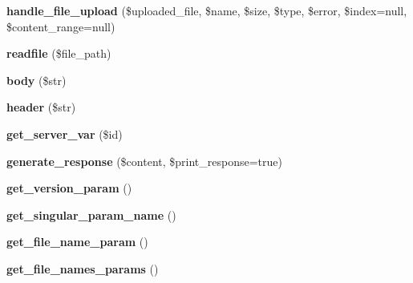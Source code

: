 \begin{DoxyCompactItemize}
\item 
\hypertarget{class_upload_handler_ad03bbc690543eac3e157c3b015d088a4}{{\bfseries handle\-\_\-file\-\_\-upload} (\$uploaded\-\_\-file, \$name, \$size, \$type, \$error, \$index=null, \$content\-\_\-range=null)}\label{class_upload_handler_ad03bbc690543eac3e157c3b015d088a4}

\item 
\hypertarget{class_upload_handler_aea88401817b9fb816c494323b285604a}{{\bfseries readfile} (\$file\-\_\-path)}\label{class_upload_handler_aea88401817b9fb816c494323b285604a}

\item 
\hypertarget{class_upload_handler_ae0c595db98ffd64843b71686f25179c5}{{\bfseries body} (\$str)}\label{class_upload_handler_ae0c595db98ffd64843b71686f25179c5}

\item 
\hypertarget{class_upload_handler_a3af02a257dae588ef2d306d5b936d7cc}{{\bfseries header} (\$str)}\label{class_upload_handler_a3af02a257dae588ef2d306d5b936d7cc}

\item 
\hypertarget{class_upload_handler_ae346ec8ea9b4ccbd606b161abe8fd49e}{{\bfseries get\-\_\-server\-\_\-var} (\$id)}\label{class_upload_handler_ae346ec8ea9b4ccbd606b161abe8fd49e}

\item 
\hypertarget{class_upload_handler_a137517f0cfb55dd68c4f868b4caf82f5}{{\bfseries generate\-\_\-response} (\$content, \$print\-\_\-response=true)}\label{class_upload_handler_a137517f0cfb55dd68c4f868b4caf82f5}

\item 
\hypertarget{class_upload_handler_a787019fce1133b3f28221c29d996b511}{{\bfseries get\-\_\-version\-\_\-param} ()}\label{class_upload_handler_a787019fce1133b3f28221c29d996b511}

\item 
\hypertarget{class_upload_handler_aadfab69e37378c1954bd569b10a4af02}{{\bfseries get\-\_\-singular\-\_\-param\-\_\-name} ()}\label{class_upload_handler_aadfab69e37378c1954bd569b10a4af02}

\item 
\hypertarget{class_upload_handler_a1c3fe091b59f890060364c40f35b51c5}{{\bfseries get\-\_\-file\-\_\-name\-\_\-param} ()}\label{class_upload_handler_a1c3fe091b59f890060364c40f35b51c5}

\item 
\hypertarget{class_upload_handler_a8df05352c75e186bed847fb5908b7473}{{\bfseries get\-\_\-file\-\_\-names\-\_\-params} ()}\label{class_upload_handler_a8df05352c75e186bed847fb5908b7473}


\end{DoxyCompactItemize}

